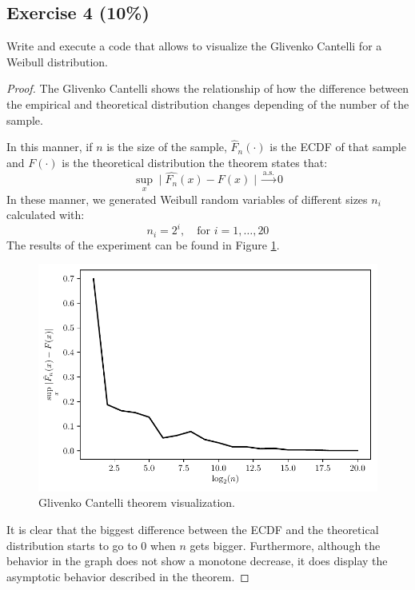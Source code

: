 \documentclass[11pt]{article}
\theoremstyle{definition}
\theoremstyle{remark}
\theoremstyle{remark}
\begin{document}
\subsection*{Exercise 4 (10\%)}
Write and execute a code that allows to visualize the Glivenko
Cantelli for a Weibull distribution.
\begin{proof}
  The Glivenko Cantelli shows the relationship of how the difference
  between the empirical and theoretical distribution changes depending
  of the number of the sample.

  In this manner, if $n$ is the size of the sample, $\hat{F}_n(\cdot)$ is
  the ECDF of that sample and $F(\cdot)$ is the theoretical distribution
  the theorem states that:
  \begin{equation*}
    \sup_x \mid \hat{F_n}(x) - F(x) \mid \xrightarrow[]{\text{a.s.}} 0
  \end{equation*}
  In these manner, we generated Weibull random variables of different
  sizes $n_i$ calculated with:
  \begin{equation*}
    n_i = 2^i, \quad \text{for } i=1,\ldots,20
  \end{equation*}
  The results of the experiment can be found in Figure \ref{fig:ex4}.
  \begin{figure}[H]
    \centering
    \includegraphics[scale=0.5]{../figs/weibull.pdf}
    \caption{Glivenko Cantelli theorem visualization.}
    \label{fig:ex4}
  \end{figure}

  It is clear that the biggest difference between the ECDF and the
  theoretical distribution starts to go to 0 when $n$ gets
  bigger. Furthermore, although the behavior in the graph does not
  show a monotone decrease, it does display the asymptotic behavior
  described in the theorem.
\end{proof}
\end{document}

